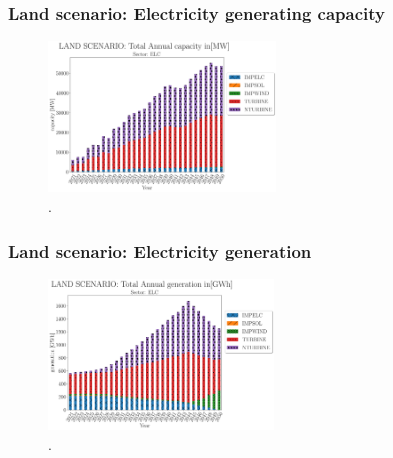 \begin{frame}
  \frametitle{Land scenario: Electricity generating capacity}
  \begin{figure}[htbp!]
    \begin{center}
      \includegraphics[height=4cm]{./images/land scenario_elc_capacity.png}
    \end{center}
    \caption{.} 
    \label{fig:land-elc-cap}
  \end{figure}
\end{frame}

\begin{frame}
  \frametitle{Land scenario: Electricity generation}
  \begin{figure}[htbp!]
    \begin{center}
      \includegraphics[height=4cm]{./images/land scenario_elc_generation.png}
    \end{center}
    \caption{.} 
    \label{fig:land-elc-gen}
  \end{figure}
\end{frame}
